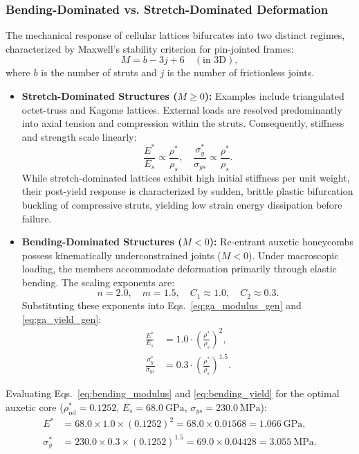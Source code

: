 \subsubsection{Bending-Dominated vs. Stretch-Dominated Deformation}
The mechanical response of cellular lattices bifurcates into two distinct regimes, characterized by Maxwell's stability criterion for pin-jointed frames:
\begin{equation}
M = b - 3j + 6 \quad (\text{in 3D}),
\label{eq:maxwell_criterion}
\end{equation}
where $b$ is the number of struts and $j$ is the number of frictionless joints.
\begin{itemize}
\item \textbf{Stretch-Dominated Structures ($M \ge 0$):} Examples include triangulated octet-truss and Kagome lattices. External loads are resolved predominantly into axial tension and compression within the struts. Consequently, stiffness and strength scale linearly:
\begin{equation}
\frac{E^*}{E_s} \propto \frac{\rho^*}{\rho_s}, \quad \frac{\sigma_y^*}{\sigma_{ys}} \propto \frac{\rho^*}{\rho_s}.
\label{eq:stretch_scaling}
\end{equation}
While stretch-dominated lattices exhibit high initial stiffness per unit weight, their post-yield response is characterized by sudden, brittle plastic bifurcation buckling of compressive struts, yielding low strain energy dissipation before failure.
\item \textbf{Bending-Dominated Structures ($M < 0$):} Re-entrant auxetic honeycombs possess kinematically underconstrained joints ($M < 0$). Under macroscopic loading, the members accommodate deformation primarily through elastic bending. The scaling exponents are:
\begin{equation}
n = 2.0, \quad m = 1.5, \quad C_1 \approx 1.0, \quad C_2 \approx 0.3.
\label{eq:bending_exponents}
\end{equation}
Substituting these exponents into Eqs.~\eqref{eq:ga_modulus_gen} and \eqref{eq:ga_yield_gen}:
\begin{align}
\frac{E^*}{E_s} &= 1.0 \cdot \left( \frac{\rho^*}{\rho_s} \right)^2, \label{eq:bending_modulus} \\
\frac{\sigma_y^*}{\sigma_{ys}} &= 0.3 \cdot \left( \frac{\rho^*}{\rho_s} \right)^{1.5}. \label{eq:bending_yield}
\end{align}
\end{itemize}

Evaluating Eqs.~\eqref{eq:bending_modulus} and \eqref{eq:bending_yield} for the optimal auxetic core ($\rho_{\text{rel}}^* = 0.1252$, $E_s = \SI{68.0}{\giga\pascal}$, $\sigma_{ys} = \SI{230.0}{\mega\pascal}$):
\begin{align}
E^* &= 68.0 \times 1.0 \times (0.1252)^2 = 68.0 \times 0.01568 = \SI{1.066}{\giga\pascal}, \label{eq:modulus_val} \\
\sigma_y^* &= 230.0 \times 0.3 \times (0.1252)^{1.5} = 69.0 \times 0.04428 = \SI{3.055}{\mega\pascal}. \label{eq:yield_val}
\end{align}

